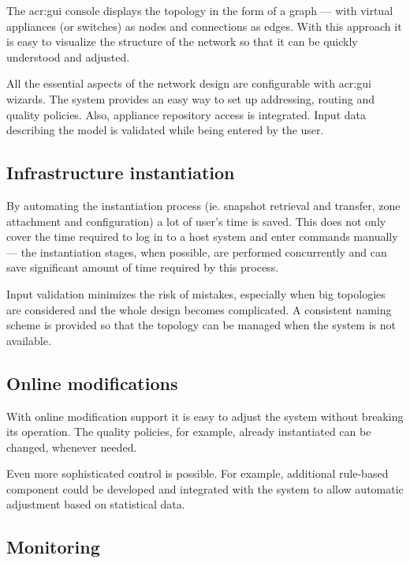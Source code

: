 \documentclass[11pt,openany]{book}
\begin{document}
        The \gls{acr:gui} console displays the topology in the form of a graph --- with virtual appliances (or switches) as nodes
        and connections as edges. With this approach it is easy to visualize the structure of the network so that it can
        be quickly understood and adjusted.

        All the essential aspects of the network design are configurable with \gls{acr:gui} wizards. The system provides an easy
        way to set up addressing, routing and quality policies. Also, appliance repository access is integrated. Input
        data describing the model is validated while being entered by the user. 


      \subsection{Infrastructure instantiation}
      \label{sub:uc:enhance:instantiation}

        By automating the instantiation process (ie. snapshot retrieval and transfer, zone attachment and configuration)
        a lot of user's time is saved. This does not only cover the time required to log in to a host system and enter
        commands manually --- the instantiation stages, when possible, are performed concurrently and can save
        significant amount of time required by this process.

        Input validation minimizes the risk of mistakes, especially when big topologies are considered and the whole
        design becomes complicated. A consistent naming scheme is provided so that the topology can be managed when the
        system is not available.


      \subsection{Online modifications}
      \label{sub:uc:enhance:online}

        With online modification support it is easy to adjust the system without breaking its operation. The quality
        policies, for example, already instantiated can be changed, whenever needed.

        Even more sophisticated control is possible. For example, additional rule-based component could be developed and
        integrated with the system to allow automatic adjustment based on statistical data.


      \subsection{Monitoring}
      \label{sub:uc:enhance:monitoring}
\end{document}

